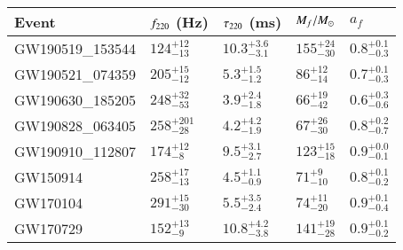 
\begin{tabular}{lllll}
\toprule
Event & $f_{\text{220}}$ (Hz) & $\tau_{\text{220}}$ (ms) & $M_f/M_{\odot}$ & $a_f$ \\[0.075cm]
\midrule
\hline

GW190519\_153544 &
$124^{+12}_{-13}$ &
$10.3^{+3.6}_{-3.1}$ &
$155^{+24}_{-30}$ &
$0.8^{+0.1}_{-0.3}$
\\[0.075cm]

GW190521\_074359 &
$205^{+15}_{-12}$ &
$5.3^{+1.5}_{-1.2}$ &
$86^{+12}_{-14}$ &
$0.7^{+0.1}_{-0.3}$
\\[0.075cm]

GW190630\_185205 &
$248^{+32}_{-53}$ &
$3.9^{+2.4}_{-1.8}$ &
$66^{+19}_{-42}$ &
$0.6^{+0.3}_{-0.6}$
\\[0.075cm]

GW190828\_063405 &
$258^{+201}_{-28}$ &
$4.2^{+4.2}_{-1.9}$ &
$67^{+26}_{-30}$ &
$0.8^{+0.2}_{-0.7}$
\\[0.075cm]

GW190910\_112807 &
$174^{+12}_{-8}$ &
$9.5^{+3.1}_{-2.7}$ &
$123^{+15}_{-18}$ &
$0.9^{+0.0}_{-0.1}$
\\[0.075cm]

GW150914 &
$258^{+17}_{-13}$ &
$4.5^{+1.1}_{-0.9}$ &
$71^{+9}_{-10}$ &
$0.8^{+0.1}_{-0.2}$
\\[0.075cm]

GW170104 &
$291^{+15}_{-30}$ &
$5.5^{+3.5}_{-2.4}$ &
$74^{+11}_{-20}$ &
$0.9^{+0.1}_{-0.4}$
\\[0.075cm]

GW170729 &
$152^{+13}_{-9}$ &
$10.8^{+4.2}_{-3.8}$ &
$141^{+19}_{-28}$ &
$0.9^{+0.1}_{-0.2}$
\\[0.075cm]

\bottomrule
\end{tabular}